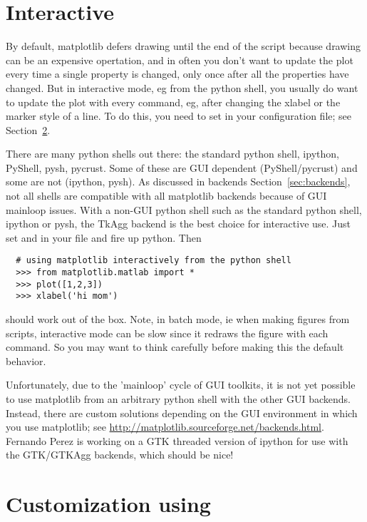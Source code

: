 \documentclass[]{book}
\begin{document}
\section{Interactive}
\label{sec:interactive}

By default, matplotlib defers drawing until the end of the script
because drawing can be an expensive opertation, and in often you don't
want to update the plot every time a single property is changed, only
once after all the properties have changed.  But in interactive mode,
eg from the python shell, you usually do want to update the plot with
every command, eg, after changing the xlabel or the marker style of a
line.  To do this, you need to set  in your
configuration file; see Section~\ref{sec:matplotlibrc}.

There are many python shells out there: the standard python shell,
ipython, PyShell, pysh, pycrust.  Some of these are GUI dependent
(PyShell/pycrust) and some are not (ipython, pysh).  As discussed in
backends Section~\ref{sec:backends}, not all shells are compatible
with all matplotlib backends because of GUI mainloop issues.  With a
non-GUI python shell such as the standard python shell, ipython or
pysh, the TkAgg backend is the best choice for interactive use.  Just
set  and  in your
file and fire up python.  Then

\begin{lstlisting}
  # using matplotlib interactively from the python shell
  >>> from matplotlib.matlab import *
  >>> plot([1,2,3])
  >>> xlabel('hi mom')
\end{lstlisting}

\noindent should work out of the box.  Note, in batch mode, ie when making
figures from scripts, interactive mode can be slow since it redraws
the figure with each command.  So you may want to think carefully
before making this the default behavior.

Unfortunately, due to the 'mainloop' cycle of GUI toolkits, it is not
yet possible to use matplotlib from an arbitrary python shell with the
other GUI backends.  Instead, there are custom solutions depending on
the GUI environment in which you use matplotlib; see
\url{http://matplotlib.sourceforge.net/backends.html}.  Fernando Perez
is working on a GTK threaded version of ipython for use with the
GTK/GTKAgg backends, which should be nice!


\section{Customization using }
\label{sec:matplotlibrc}
\end{document}
